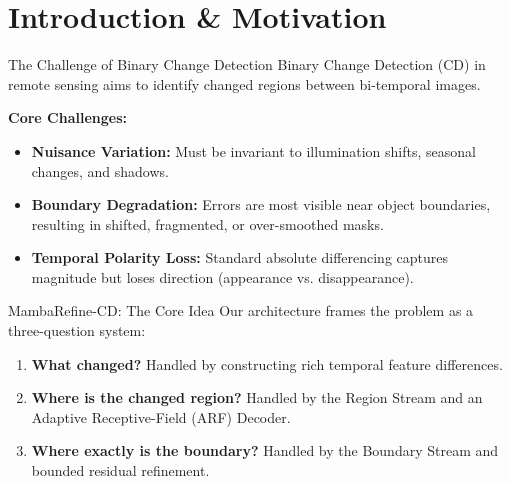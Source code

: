 \section{Introduction \& Motivation}

\begin{frame}{The Challenge of Binary Change Detection}
    Binary Change Detection (CD) in remote sensing aims to identify changed regions between bi-temporal images.
    
    \vspace{0.5em}
    \textbf{Core Challenges:}
    \begin{itemize}
        \item \textbf{Nuisance Variation:} Must be invariant to illumination shifts, seasonal changes, and shadows.
        \item \textbf{Boundary Degradation:} Errors are most visible near object boundaries, resulting in shifted, fragmented, or over-smoothed masks.
        \item \textbf{Temporal Polarity Loss:} Standard absolute differencing captures magnitude but loses direction (appearance vs. disappearance).
    \end{itemize}
\end{frame}

\begin{frame}{MambaRefine-CD: The Core Idea}
    Our architecture frames the problem as a three-question system:
    
    \vspace{0.5em}
    \begin{enumerate}
        \item \textbf{What changed?} Handled by constructing rich temporal feature differences.
        \item \textbf{Where is the changed region?} Handled by the Region Stream and an Adaptive Receptive-Field (ARF) Decoder.
        \item \textbf{Where exactly is the boundary?} Handled by the Boundary Stream and bounded residual refinement.
    \end{enumerate}
\end{frame}
